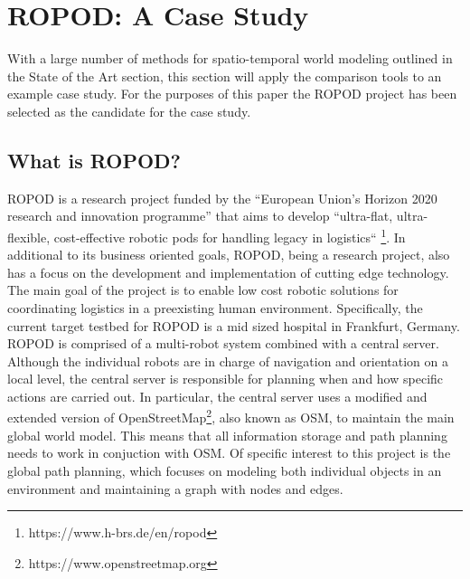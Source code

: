 

  \chapter{ROPOD: A Case Study}

  With a large number of methods for spatio-temporal world modeling outlined
  in the State of the Art section, this section will apply the comparison tools
  to an example case study. For the
  purposes of this paper the ROPOD project has been selected as the
  candidate for the case study. \\

  \section{ What is ROPOD? }

  ROPOD is a research project
  funded by the ``European Union's Horizon 2020 research and innovation programme''
  that aims to develop ``ultra-flat, ultra-flexible,
  cost-effective robotic pods for handling legacy in logistics``
  \footnote[1]{https://www.h-brs.de/en/ropod}. In additional to its business
  oriented goals, ROPOD, being a research project, also has a focus on the
  development and implementation of cutting edge technology.  The main goal of
  the project is to enable low cost robotic solutions for coordinating logistics
  in a preexisting human environment. Specifically, the current target
  testbed for ROPOD is a mid sized hospital in Frankfurt, Germany.
  ROPOD is comprised of a multi-robot system combined with a central server.
  Although the individual robots are in charge of navigation and orientation
  on a local level, the central server is responsible for planning when and
  how specific actions are carried out. In particular, the central server uses a
  modified and extended version of
  OpenStreetMap\footnote[2]{https://www.openstreetmap.org}, also known as OSM, to
  maintain the main global world model.
  This means that all information storage and path planning needs to work in
  conjuction with OSM. Of specific interest to this project is the global path
  planning, which focuses on modeling both individual objects in an
  environment and maintaining a graph with nodes and edges. \\


